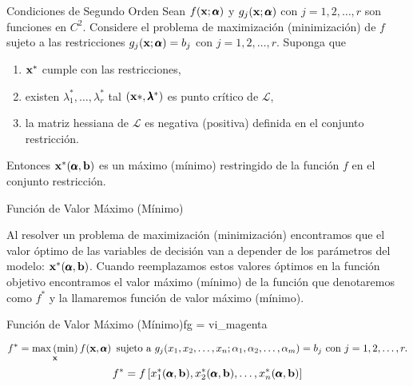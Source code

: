 \documentclass[10pt,aspectratio=169]{beamer}  %
\begin{document}
\begin{frame}{Condiciones de Segundo Orden}
	Sean $f(\mathbf{x}; \pmb{\alpha})$ y $g_j(\mathbf{x}; \pmb{\alpha})$ con 	$j = 1, 2, \dots, r$ son funciones en $C^2$. Considere el problema de
	maximización (minimización) de $f$ sujeto a las restricciones $g_j(\mathbf{x}; \pmb{\alpha}) = b_j$ con $j = 1, 2, \dots, r$. Suponga que

	\begin{enumerate}[label=(\alph*)]
		\item $\mathbf{x}^* $  cumple con las restricciones,
		\item existen $\lambda_1^*, \dots, \lambda_r^*$ tal $(\mathbf{x}*, \pmb{\lambda}^*)$ es punto crítico de $\mathcal{L}$,
		\item la matriz hessiana de $\mathcal{L}$ es negativa (positiva) definida en el conjunto restricción.
	\end{enumerate}

	Entonces $\mathbf{x}^*(\pmb{\alpha}, \mathbf{b})$ es un máximo (mínimo) restringido de la función $f$ en el conjunto restricción.
\end{frame}



\begin{frame}{Función de Valor Máximo (Mínimo)}
	
	Al resolver un problema de maximización (minimización) encontramos que el valor óptimo
	de las variables de decisión van a depender de los parámetros del modelo: $\mathbf{x}^*(\pmb{\alpha}, \mathbf{b})$. Cuando 
	reemplazamos estos valores óptimos en la función objetivo encontramos el valor máximo (mínimo) de la función 
	que denotaremos como $f^*$ y la llamaremos función de valor máximo (mínimo). 
	\vspace{10pt}

	\begin{varblock}{Función de Valor Máximo (Mínimo)}{fg = vi_magenta}
	  
		\[ f^* = \underset{\mathbf{x}}{\max \, (\min)} \, f(\mathbf{x}, \pmb{\alpha}) \, \text{ sujeto a }  g_j(x_1, x_2, \dots, x_n; \alpha_1, \alpha_2, \dots, \alpha_m) = b_j 
		\text{ con } j = 1, 2, \dots, r. \]
%
		\[f^* = f\left[x_1^*(\pmb{\alpha}, \mathbf{b}), x_2^*(\pmb{\alpha}, \mathbf{b}), \dots, x_n^*(\pmb{\alpha}, \mathbf{b})\right]\]
	\end{varblock}

\end{frame}
\end{document}
